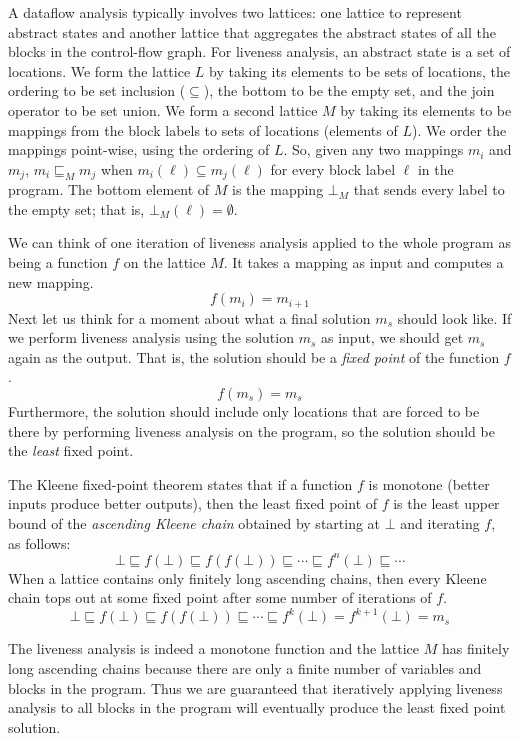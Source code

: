 \documentclass[7x10]{TimesAPriori_MIT}%
\numberwithin{theorem}{chapter}
\numberwithin{definition}{chapter}
\numberwithin{equation}{chapter}
\begin{document}
A dataflow analysis typically involves two lattices: one lattice to
represent abstract states and another lattice that aggregates the
abstract states of all the blocks in the control-flow graph.  For
liveness analysis, an abstract state is a set of locations.  We form
the lattice $L$ by taking its elements to be sets of locations, the
ordering to be set inclusion ($\subseteq$), the bottom to be the empty
set, and the join operator to be set union.
%
We form a second lattice $M$ by taking its elements to be mappings
from the block labels to sets of locations (elements of $L$).  We
order the mappings point-wise, using the ordering of $L$. So, given any
two mappings $m_i$ and $m_j$, $m_i \sqsubseteq_M m_j$ when $m_i(\ell)
\subseteq m_j(\ell)$ for every block label $\ell$ in the program.  The
bottom element of $M$ is the mapping $\bot_M$ that sends every label
to the empty set; that is, $\bot_M(\ell) = \emptyset$.

We can think of one iteration of liveness analysis applied to the
whole program as being a function $f$ on the lattice $M$. It takes a
mapping as input and computes a new mapping.
\[
   f(m_i) = m_{i+1}
\]
Next let us think for a moment about what a final solution $m_s$
should look like. If we perform liveness analysis using the solution
$m_s$ as input, we should get $m_s$ again as the output. That is, the
solution should be a \emph{fixed point} of the function $f$.
\[
   f(m_s) = m_s
\]
Furthermore, the solution should include only locations that are
forced to be there by performing liveness analysis on the program, so
the solution should be the \emph{least} fixed point.

The Kleene fixed-point theorem states that if a function $f$ is
monotone (better inputs produce better outputs), then the least fixed
point of $f$ is the least upper bound of the \emph{ascending Kleene
  chain} obtained by starting at $\bot$ and iterating $f$, as
follows:
\[
\bot \sqsubseteq f(\bot) \sqsubseteq f(f(\bot)) \sqsubseteq \cdots
  \sqsubseteq f^n(\bot) \sqsubseteq \cdots
\]
When a lattice contains only finitely long ascending chains, then
every Kleene chain tops out at some fixed point after some number of
iterations of $f$.
\[
\bot \sqsubseteq f(\bot) \sqsubseteq f(f(\bot)) \sqsubseteq \cdots
\sqsubseteq f^k(\bot) = f^{k+1}(\bot) = m_s
\]

The liveness analysis is indeed a monotone function and the lattice
$M$ has finitely long ascending chains because there are only a
finite number of variables and blocks in the program. Thus we are
guaranteed that iteratively applying liveness analysis to all blocks
in the program will eventually produce the least fixed point solution.
\end{document}
